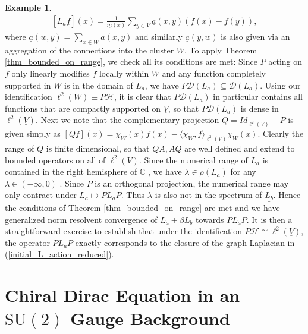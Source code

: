 \documentclass[reqno,12pt,letterpaper]{amsart}
\numberwithin{equation}{section}
\newcommand{\1}{\mathds{1}}
\theoremstyle{definition}
\newtheorem{Ex}[Th]{Example}
\begin{document}
\begin{Ex}
 \begin{align}\label{initial_L_action_reduced}
	[\underline{L_a}\underline{f}](x) = \frac{1}{\underline{m}(x)} \sum\limits_{y \in \underline{V}} \underline{a}(x,y) (\underline{f}(x) - \underline{f}(y)),
\end{align}
where $\underline{a}(w,y) = \sum_{x \in  W } a(x,y)$ and similarly $\underline{a}(y,w)$ is also given via an aggregation of the connections into the cluster $W$. To apply Theorem \ref{thm_bounded_on_range}, we check all its conditions are met: 
 Since $P$ acting on $f$ only linearly modifies $f$ locally within $W$ and any function completely supported in $W$ is in the domain of $L_a$, we have $P \mathcal{D}(L_a) \subseteq \mathcal{D}(L_a)$. Using our identification $\ell^2(W) \equiv P\mathcal{H}$, it is clear that $P\mathcal{D}(L_a)$ in particular contains all functions that are compactly supported on $\underline{V}$, so that $P\mathcal{D}(L_a)$ is dense in $\ell^2(\underline{V})$.
Next we note that the complementary projection $Q= Id_{\ell^2(V)} - P$ is given simply as $[Qf](x) = \chi_W(x)f(x) - \langle \chi_W,f \rangle_{\ell^2(V)} \chi_W(x) $. Clearly the range of $Q$ is finite dimensional, so that $QA,AQ$ are well defined and extend to bounded operators on all of $\ell^2(V)$. Since the numerical range of  $L_a$ is contained in the right hemisphere of $\mathds{C}$ \cite[Proposition 2.2]{anne2018sectoriality}, we have $\lambda \in \rho(L_a)$ for any $\lambda \in (-\infty, 0)$ \cite{ArlinskiZagrebnov2010,kato1995perturbation}. Since $P$ is an orthogonal projection, the numerical range may only contract under $L_a \mapsto P L_a P$. Thus $\lambda$ is also not in the spectrum of $\underline{L_b}$. Hence the conditions of Theorem \ref{thm_bounded_on_range} are met and we have generalized norm resolvent convergence of $L_a + \beta L_b$ towards $PL_aP$. It is then a straightforward exercise to establish that under the identification $P\mathcal{H} \cong \ell^2(\underline{V})$, the operator $PL_aP$ exactly corresponds to the closure of the graph Laplacian  in (\ref{initial_L_action_reduced}).





	
\end{Ex} 
	\appendix
	
	
	\section{Chiral Dirac Equation in an \(\mathrm{SU}(2)\) Gauge Background}
	
\end{document}
